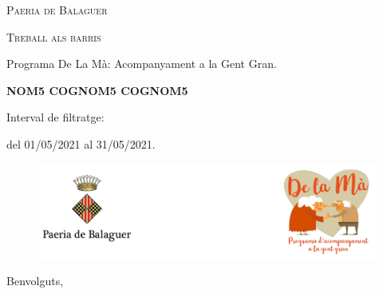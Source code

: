 \documentclass[a4paper,12pt]{elsarticle}  %
\begin{document}
 	


\begin{titlepage}
	\centering

	{\scshape\LARGE Paeria de Balaguer \par}


			\vfill


	{\scshape\Large Treball als barris\par}

	
			\vspace{0.5cm}

	
	{\Large Programa De La Mà: Acompanyament a la Gent Gran.\par}

			

			\vfill



	{\Large\bfseries NOM5 COGNOM5 COGNOM5 \par}
	


			\vfill



	{\large Interval de filtratge:\par}
	{\large del 01/05/2021 al 31/05/2021.\par}
		

\end{titlepage}



\clearpage







\FloatBarrier
\begin{figure}[h]
	\centering	
	\includegraphics[width=1\textwidth]{../IMATGES/logoPaeriaMa.png}
\end{figure}
\FloatBarrier	

\vfill









\noindent Benvolguts,

	\vspace{0.5cm}
\end{document}
